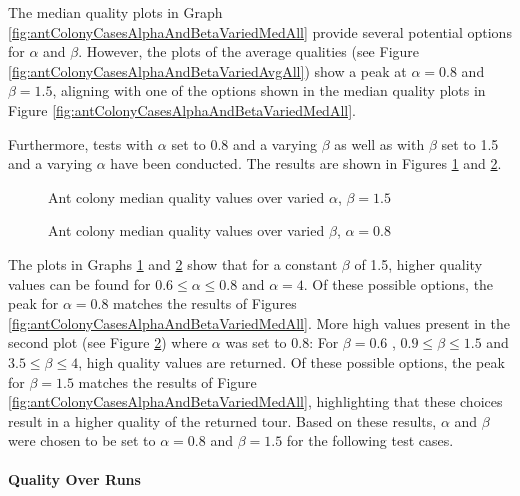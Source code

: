 The median quality plots in Graph \ref{fig:antColonyCasesAlphaAndBetaVariedMedAll} provide several potential options for $\alpha$ and $\beta$. 
However, the plots of the average qualities (see Figure \ref{fig:antColonyCasesAlphaAndBetaVariedAvgAll}) show a peak at $\alpha = 0.8$ and $\beta = 1.5$, aligning with one of the options shown in the median quality plots in Figure \ref{fig:antColonyCasesAlphaAndBetaVariedMedAll}.

Furthermore, tests with $\alpha$ set to 0.8 and a varying $\beta$ as well as with $\beta$ set to 1.5 and a varying $\alpha$ have been conducted.
The results are shown in Figures \ref{fig:antColonyCasesAlphaVariedBeta15} and \ref{fig:antColonyCasesBetaVariedAlpha08}.


\begin{figure}
	\centering
	
	\caption{Ant colony median quality values over varied $\alpha$, $\beta = 1.5$}
	\label{fig:antColonyCasesAlphaVariedBeta15}
\end{figure}

\begin{figure}
	\centering
	
	\caption{Ant colony median quality values over varied $\beta$, $\alpha = 0.8$}
	\label{fig:antColonyCasesBetaVariedAlpha08}
\end{figure}


The plots in Graphs \ref{fig:antColonyCasesAlphaVariedBeta15} and \ref{fig:antColonyCasesBetaVariedAlpha08} show that for a constant $\beta$ of 1.5, higher quality values can be found for $ 0.6 \leq \alpha \leq 0.8$ and $\alpha = 4$.
Of these possible options, the peak for $\alpha = 0.8$ matches the results of Figures \ref{fig:antColonyCasesAlphaAndBetaVariedMedAll}.
More high values present in the second plot (see Figure \ref{fig:antColonyCasesBetaVariedAlpha08}) where $\alpha$ was set to 0.8:
For $\beta = 0.6$ , $0.9 \leq \beta \leq 1.5$ and $3.5 \leq \beta \leq 4$, high quality values are returned.
Of these possible options, the peak for $\beta = 1.5$ matches the results of Figure \ref{fig:antColonyCasesAlphaAndBetaVariedMedAll}, highlighting that these choices result in a higher quality of the returned tour.
Based on these results, $\alpha$ and $\beta$ were chosen to be set to $\alpha = 0.8$ and $\beta = 1.5$ for the following test cases.


\paragraph{Quality Over Runs}

